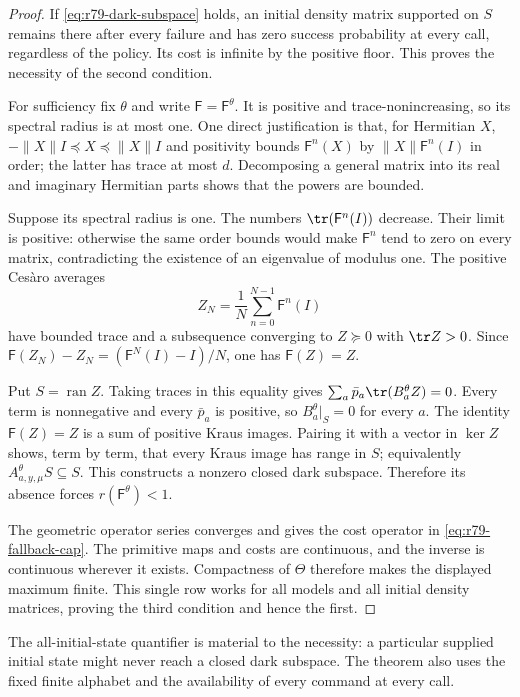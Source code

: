 \begin{proof}
If \eqref{eq:r79-dark-subspace} holds, an initial density matrix
supported on $S$ remains there after every failure and has zero
success probability at every call, regardless of the policy.  Its
cost is infinite by the positive floor.  This proves the necessity
of the second condition.

For sufficiency fix $\theta$ and write $\mathsf F=\mathsf F^\theta$.
It is positive and trace-nonincreasing, so its spectral radius is
at most one.  One direct justification is that, for Hermitian $X$,
$-\|X\|I\preccurlyeq X\preccurlyeq\|X\|I$ and positivity bounds
$\mathsf F^n(X)$ by $\|X\|\mathsf F^n(I)$ in order; the latter
has trace at most $d$.  Decomposing a general matrix into its real
and imaginary Hermitian parts shows that the powers are bounded.

Suppose its spectral radius is one.  The numbers
$\tr(\mathsf F^n(I))$ decrease.  Their limit is positive: otherwise
the same order bounds would make $\mathsf F^n$ tend to zero on
every matrix, contradicting the existence of an eigenvalue of
modulus one.  The positive Ces\`aro averages
\[
 Z_N=\frac1N\sum_{n=0}^{N-1}\mathsf F^n(I)
\]
have bounded trace and a subsequence converging to $Z\succeq0$ with
$\tr Z>0$.  Since
$\mathsf F(Z_N)-Z_N=(\mathsf F^N(I)-I)/N$, one has
$\mathsf F(Z)=Z$.

Put $S=\operatorname{ran}Z$.  Taking traces in this equality gives
$\sum_a\bar p_a\tr(B^\theta_aZ)=0$.  Every term is nonnegative
and every $\bar p_a$ is positive, so $B^\theta_a|_S=0$ for every
$a$.  The identity $\mathsf F(Z)=Z$ is a sum of positive Kraus
images.  Pairing it with a vector in $\ker Z$ shows, term by term,
that every Kraus image has range in $S$; equivalently
$A^\theta_{a,y,\mu}S\subseteq S$.  This constructs a nonzero
closed dark subspace.  Therefore its absence forces
$r(\mathsf F^\theta)<1$.

The geometric operator series converges and gives the cost operator
in \eqref{eq:r79-fallback-cap}.  The primitive maps and costs are
continuous, and the inverse is continuous wherever it exists.
Compactness of $\Theta$ therefore makes the displayed maximum
finite.  This single row works for all models and all initial
density matrices, proving the third condition and hence the first.
\end{proof}

The all-initial-state quantifier is material to the necessity:
a particular supplied initial state might never reach a closed dark
subspace.  The theorem also uses the fixed finite alphabet and the
availability of every command at every call.

